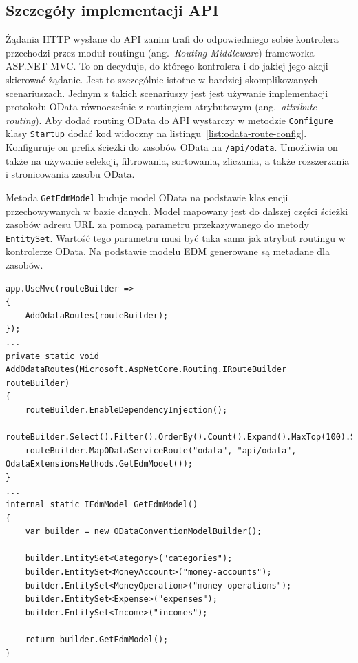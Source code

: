 \subsection{Szczegóły implementacji API}
\label{subsec:szczegoly-implementacji-api}

Żądania HTTP wysłane do API zanim trafi do odpowiedniego sobie kontrolera przechodzi przez moduł routingu (ang.~\emph{Routing Middleware}) frameworka ASP.NET MVC. To on decyduje, do którego kontrolera i do jakiej jego akcji skierować żądanie. Jest to szczególnie istotne w bardziej skomplikowanych scenariuszach. Jednym z takich scenariuszy jest jest używanie implementacji protokołu OData równocześnie z routingiem atrybutowym (ang.~\emph{attribute routing}). Aby dodać routing OData do API wystarczy w metodzie \texttt{Configure} klasy \texttt{Startup} dodać kod widoczny na listingu~\ref{list:odata-route-config}. Konfiguruje on prefix ścieżki do zasobów OData na \texttt{/api/odata}. Umożliwia on także na używanie selekcji, filtrowania, sortowania, zliczania, a także rozszerzania i stronicowania zasobu OData. 

Metoda \texttt{GetEdmModel} buduje model OData na podstawie klas encji przechowywanych w bazie danych. Model mapowany jest do dalszej części ścieżki zasobów adresu URL za pomocą parametru przekazywanego do metody \texttt{EntitySet}. Wartość tego parametru musi być taka sama jak atrybut routingu w kontrolerze OData. Na podstawie modelu EDM generowane są metadane dla zasobów. 

{\belowcaptionskip=-10pt
\begin{lstlisting}[label=list:odata-route-config,
    caption=Konfiguracja rouingu OData w aplikacji MVC]
app.UseMvc(routeBuilder =>
{
    AddOdataRoutes(routeBuilder);
});
...
private static void AddOdataRoutes(Microsoft.AspNetCore.Routing.IRouteBuilder routeBuilder)
{
    routeBuilder.EnableDependencyInjection();
    routeBuilder.Select().Filter().OrderBy().Count().Expand().MaxTop(100).SkipToken();
    routeBuilder.MapODataServiceRoute("odata", "api/odata", OdataExtensionsMethods.GetEdmModel());
}
...
internal static IEdmModel GetEdmModel()
{
    var builder = new ODataConventionModelBuilder();

    builder.EntitySet<Category>("categories");
    builder.EntitySet<MoneyAccount>("money-accounts");
    builder.EntitySet<MoneyOperation>("money-operations");
    builder.EntitySet<Expense>("expenses");
    builder.EntitySet<Income>("incomes");

    return builder.GetEdmModel();
}
\end{lstlisting}
}

